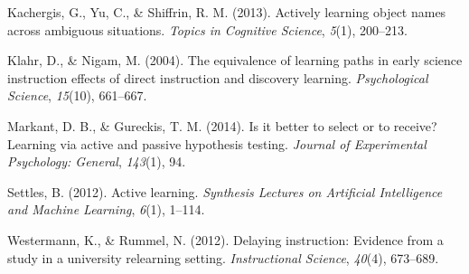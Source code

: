 \documentclass[10pt, letterpaper]{article}
\begin{document}
Kachergis, G., Yu, C., \& Shiffrin, R. M. (2013). Actively learning
object names across ambiguous situations. \emph{Topics in Cognitive
Science}, \emph{5}(1), 200--213.

Klahr, D., \& Nigam, M. (2004). The equivalence of learning paths in
early science instruction effects of direct instruction and discovery
learning. \emph{Psychological Science}, \emph{15}(10), 661--667.

Markant, D. B., \& Gureckis, T. M. (2014). Is it better to select or to
receive? Learning via active and passive hypothesis testing.
\emph{Journal of Experimental Psychology: General}, \emph{143}(1), 94.

Settles, B. (2012). Active learning. \emph{Synthesis Lectures on
Artificial Intelligence and Machine Learning}, \emph{6}(1), 1--114.

Westermann, K., \& Rummel, N. (2012). Delaying instruction: Evidence
from a study in a university relearning setting. \emph{Instructional
Science}, \emph{40}(4), 673--689.
\end{document}
